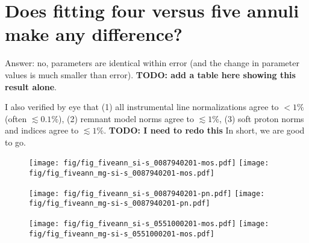 \documentclass[preprint2,tighten,trackchanges]{aastex6}
\begin{document}
\clearpage
\section{Does fitting four versus five annuli make any difference?}

Answer: no, parameters are identical within error (and the change in parameter
values is much smaller than error).
\textbf{TODO: add a table here showing this result alone}.

I also verified by eye that
(1) all instrumental line normalizations agree to $<1\%$ (often $\lesssim0.1\%$),
(2) remnant model norms agree to $\lesssim 1$\%,
(3) soft proton norms and indices agree to $\lesssim 1\%$.
\textbf{TODO: I need to redo this}
In short, we are good to go.

\begin{figure}[!hb]
  \texttt{[image: fig/fig\_fiveann\_si-s\_0087940201-mos.pdf]}
  \texttt{[image: fig/fig\_fiveann\_mg-si-s\_0087940201-mos.pdf]} \\
\end{figure}

\begin{figure}[!hb]
  \texttt{[image: fig/fig\_fiveann\_si-s\_0087940201-pn.pdf]}
  \texttt{[image: fig/fig\_fiveann\_mg-si-s\_0087940201-pn.pdf]}
\end{figure}

\begin{figure}[!hb]
  \texttt{[image: fig/fig\_fiveann\_si-s\_0551000201-mos.pdf]}
  \texttt{[image: fig/fig\_fiveann\_mg-si-s\_0551000201-mos.pdf]}
\end{figure}

\clearpage
\end{document}
